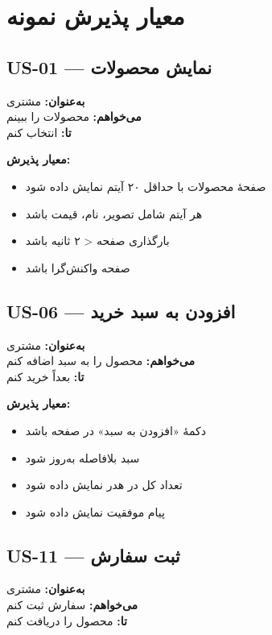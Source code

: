 \documentclass[12pt, a4paper]{article}
\begin{document}
\section{معیار پذیرش نمونه}

\subsection{US-01 — نمایش محصولات}

\textbf{به‌عنوان:} مشتری \\
\textbf{می‌خواهم:} محصولات را ببینم \\
\textbf{تا:} انتخاب کنم

\textbf{معیار پذیرش:}
\begin{itemize}
    \item صفحهٔ محصولات با حداقل ۲۰ آیتم نمایش داده شود
    \item هر آیتم شامل تصویر، نام، قیمت باشد
    \item بارگذاری صفحه < ۲ ثانیه باشد
    \item صفحه واکنش‌گرا باشد
\end{itemize}

\subsection{US-06 — افزودن به سبد خرید}

\textbf{به‌عنوان:} مشتری \\
\textbf{می‌خواهم:} محصول را به سبد اضافه کنم \\
\textbf{تا:} بعداً خرید کنم

\textbf{معیار پذیرش:}
\begin{itemize}
    \item دکمهٔ «افزودن به سبد» در صفحه باشد
    \item سبد بلافاصله به‌روز شود
    \item تعداد کل در هدر نمایش داده شود
    \item پیام موفقیت نمایش داده شود
\end{itemize}

\subsection{US-11 — ثبت سفارش}

\textbf{به‌عنوان:} مشتری \\
\textbf{می‌خواهم:} سفارش ثبت کنم \\
\textbf{تا:} محصول را دریافت کنم
\end{document}
